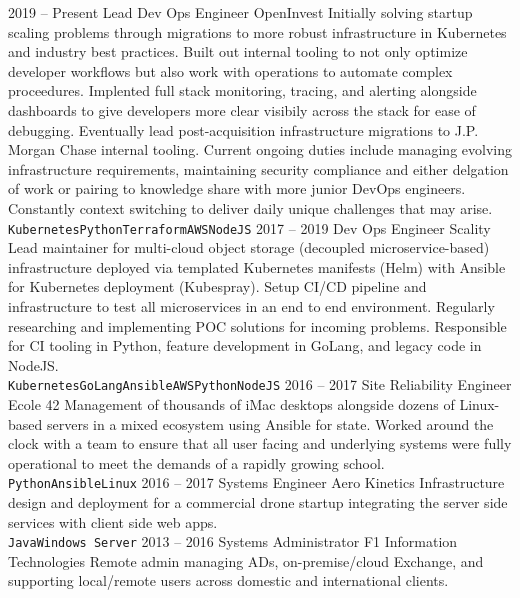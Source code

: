 \documentclass[10pt]{developercv} %
\begin{document}

\begin{entrylist}
	\entry
		{2019 -- Present}
		{\Large Lead Dev Ops Engineer}
		{\large OpenInvest}
		{\small Initially solving startup scaling problems through migrations to more robust infrastructure in \mbox{Kubernetes} and industry best practices. Built out
		internal tooling to not only optimize developer workflows but also work with operations to automate complex proceedures. Implented full stack monitoring, 
		tracing, and alerting alongside dashboards to give developers more clear visibily across the stack for ease of debugging. Eventually lead post-acquisition
		infrastructure migrations to J.P. Morgan Chase internal tooling. Current ongoing duties include managing evolving infrastructure requirements, maintaining
		security compliance and either delgation of work or pairing to knowledge share with more junior DevOps engineers. Constantly context switching to deliver
		daily unique challenges that may arise. \\
		\texttt{Kubernetes}\slashsep\texttt{Python}\slashsep\texttt{Terraform}\slashsep\texttt{AWS}\slashsep\texttt{NodeJS}}
	\entry
		{2017 -- 2019}
		{\Large Dev Ops Engineer}
		{\large Scality}
		{\small Lead maintainer for multi-cloud object storage (decoupled microservice-based) infrastructure
		deployed via templated Kubernetes manifests (Helm) with Ansible for Kubernetes deployment (Kubespray).
		Setup CI/CD pipeline and infrastructure to test all microservices in an end to end environment. Regularly
		researching and implementing POC solutions for incoming problems. Responsible for CI tooling in Python,
		feature development in GoLang, and legacy code in NodeJS.\\
		\texttt{Kubernetes}\slashsep\texttt{GoLang}\slashsep\texttt{Ansible}\slashsep\texttt{AWS}\slashsep\texttt{Python}\slashsep\texttt{NodeJS}}
	\entry
		{2016 -- 2017}
		{\Large Site Reliability Engineer}
		{\large Ecole 42}
		{\small Management of thousands of iMac desktops alongside dozens of Linux-based servers in a mixed ecosystem using Ansible for state. Worked around
		the clock with a team to ensure that all user facing and underlying systems were fully operational to meet the demands of a rapidly growing school. \\
		\texttt{Python}\slashsep\texttt{Ansible}\slashsep\texttt{Linux}}
	\entry
		{2016 -- 2017}
		{\Large Systems Engineer}
		{\large Aero Kinetics}
		{\small Infrastructure design and deployment for a commercial drone startup integrating the server side services with client side web apps.\\\texttt{Java}\slashsep\texttt{Windows Server}}
	\entry
		{2013 -- 2016}
		{\Large Systems Administrator}
		{\large F1 Information Technologies}
		{\small Remote admin managing ADs, on-premise/cloud Exchange, and supporting local/remote users across domestic and international clients.}


\end{entrylist}
\end{document}
